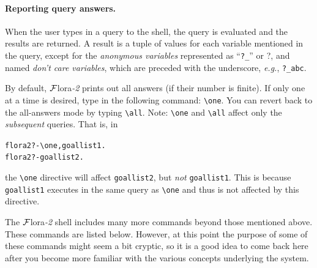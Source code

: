 \documentclass[11pt]{article}
\newcommand{\FLORA}{{\mbox{\sc ${\cal F}${lora}\rm\emph{-2}}}\xspace}
\newcommand{\FLSYSTEM}{\FLORA}
\newcommand{\prompt}{flora2 ?- }
\newcommand{\anon}{?}
\newcommand{\bs}{\textbackslash}
\begin{document}
\paragraph{Reporting query answers.}
When the user types in a query to the shell, the query is evaluated and the
results are returned. A result is a tuple of values for each variable
mentioned in the query, except for the \emph{anonymous variables}
represented as ``{\tt ?\_}'' or \anon, and named {\em don't care
variables}, which are
preceded with the underscore, {\it e.g.}, {\tt ?\_abc}.

By default, \FLSYSTEM prints out all answers (if their number is finite). If only one at a time is
desired, type in the following command: {\tt \bs{}one}. You can revert back to
the all-answers mode by typing {\tt \bs{}all}. Note: {\tt \bs{}one} and {\tt \bs{}all}
affect only the \emph{subsequent} queries. That is, in
\begin{alltt}
     \prompt \bs{}one, goallist1.
     \prompt goallist2.
\end{alltt}
the {\tt \bs{}one} directive will affect {\tt goallist2},
but \emph{not} {\tt goallist1}. This is because {\tt goallist1} executes in
the same query as {\tt \bs{}one} and thus is not affected by this directive.

The \FLSYSTEM shell includes many more commands beyond those mentioned above.
These commands are listed below. However, at this point the purpose of some
of these commands might seem a bit cryptic, so it is a good idea to come
back here after you become more familiar with the various concepts
underlying the system.
\end{document}
